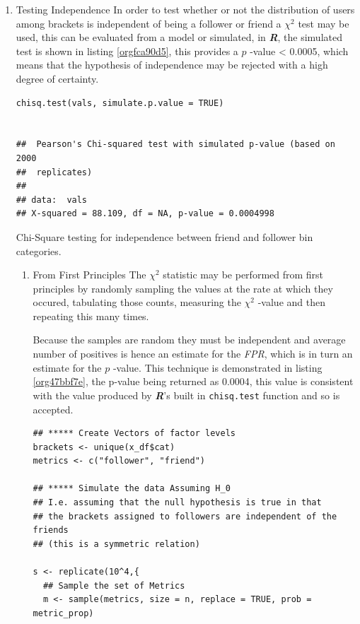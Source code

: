 \documentclass[11pt]{article}
\begin{document}
\begin{enumerate}
\item Testing Independence
\label{sec:orgbbb902c}
In order to test whether or not the distribution of users among brackets is
independent of being a follower or friend a \(\chi^{2}\) test may be used, this
can be evaluated from a model or simulated, in \textbf{\emph{R}}, the simulated test is
shown in listing \ref{orgfca90d5}, this provides a \(p\) -value < 0.0005, which means that the hypothesis of independence may be rejected with a high degree of certainty.

\begin{listing}[htbp]
\begin{verbatim}
chisq.test(vals, simulate.p.value = TRUE)


## 	Pearson's Chi-squared test with simulated p-value (based on 2000
## 	replicates)
##
## data:  vals
## X-squared = 88.109, df = NA, p-value = 0.0004998
\end{verbatim}
\caption{\label{orgfca90d5}Chi-Square testing for independence between friend and follower bin categories.}
\end{listing}

\begin{enumerate}
\item From First Principles
\label{sec:org131ff39}
The \(\chi^{2}\) statistic may be performed from first principles by randomly
sampling the values at the rate at which they occured, tabulating those counts, measuring the \(\chi^{2}\) -value and then repeating this many times.

Because the samples are random they must be independent and average number of
positives is hence an estimate for the \emph{FPR}, which is in turn an estimate for
the \(p\) -value. This technique is demonstrated in listing \ref{org47bbf7e}, the p-value
being returned as 0.0004, this value is consistent with the value produced by
\textbf{\emph{R}}'s built in \texttt{chisq.test} function and so is accepted.

\begin{listing}[htbp]
\begin{verbatim}
## ***** Create Vectors of factor levels
brackets <- unique(x_df$cat)
metrics <- c("follower", "friend")

## ***** Simulate the data Assuming H_0
## I.e. assuming that the null hypothesis is true in that
## the brackets assigned to followers are independent of the friends
## (this is a symmetric relation)

s <- replicate(10^4,{
  ## Sample the set of Metrics
  m <- sample(metrics, size = n, replace = TRUE, prob = metric_prop)


\end{verbatim}
\end{listing}
\end{enumerate}
\end{enumerate}
\end{document}
